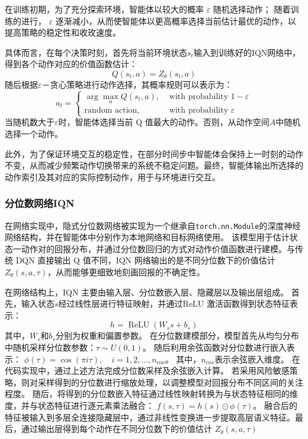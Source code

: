 在训练初期，为了充分探索环境，智能体以较大的概率  $\varepsilon$  随机选择动作；
随着训练的进行， $\varepsilon$  逐渐减小，从而使智能体以更高概率选择当前估计最优的动作，以提高策略的稳定性和收玫速度。

具体而言，在每个决策时刻，首先将当前环境状态$s_{t}$输入到训练好的IQN网络中，得到各个动作对应的价值函数估计：
\begin{equation}
Q\left(s_{t}, a\right)=Z_{\theta}\left(s_{t}, a\right)
\end{equation}
随后根据$\varepsilon$－贪心策略进行动作选择，其概率规则可以表示为：
\begin{equation}
a_{t}=\left\{\begin{array}{ll}
\arg \max _{a} Q\left(s_{t}, a\right), & \text { with probability } 1-\varepsilon \\
\operatorname{random} \text { action, } & \text { with probability } \varepsilon
\end{array}\right.
\end{equation}
当随机数大于$\varepsilon$时，智能体选择当前 Q 值最大的动作。否则，从动作空间$A$中随机选择一个动作。

此外，为了保证环境交互的稳定性，在部分时间步中智能体会保持上一时刻的动作不变，从而减少频繁动作切换带来的系统不稳定问题。最终，智能体输出所选择的动作索引及其对应的实际控制动作，用于与环境进行交互。
\subsubsection{分位数网络IQN}
在网络实现中，隐式分位数网络被实现为一个继承自\texttt{torch.nn.Module}的深度神经网络结构，并在智能体中分别作为本地网络和目标网络使用。
该模型用于估计状态一动作对的回报分布，并通过分位数回归的方式对动作价值函数进行建模。与传统 DQN 直接输出 Q 值不同，IQN 网络输出的是不同分位数下的价值估计$Z_{\theta}(s, a, \tau)$，从而能够更细致地刻画回报的不确定性。

在网络结构上，IQN 主要由输入层、分位数嵌入层、隐藏层以及输出层组成。
首先，输入状态$s$经过线性层进行特征映射，并通过ReLU 激活函数得到状态特征表示：
\begin{equation}
h=\operatorname{ReLU}\left(W_{s} s+b_{s}\right)
\end{equation}
其中，$W_{s}$和$b_{s}$分别为权重和偏置参数。
在分位数建模部分，模型首先从均匀分布中随机采样分位数参数：$\tau \sim U(0,1)$。
随后利用余弦函数对分位数进行嵌入表示：
$\phi(\tau)=\cos (\pi i \tau), \quad i=1,2, \ldots, n_{\cos }$。
其中，$n_{c o s}$表示余弦嵌入维度。
在代码实现中，通过上述方法完成分位数采样及余弦嵌入计算。
若采用风险敏感策略，则对采样得到的分位数进行缩放处理，以调整模型对回报分布不同区间的关注程度。
随后，将得到的分位数嵌入特征通过线性映射转换为与状态特征相同的维度，并与状态特征进行逐元素乘法融合：
$f(s, \tau)=h(s) \odot \phi(\tau)$。
融合后的特征被输入到多层全连接隐藏层中，通过非线性变换进一步提取高层语义特征。最后，通过输出层得到每个动作在不同分位数下的价值估计
$Z_{\theta}(s, a, \tau)$

